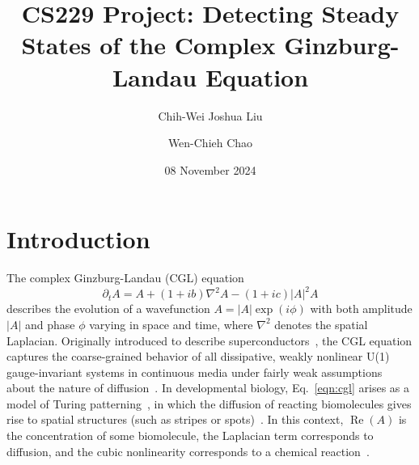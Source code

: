 \documentclass[nofootinbib,pre,superscriptaddress,twocolumn,longbibliography,floatfix]{revtex4-2}
\DeclareMathOperator{\realpart}{Re}
\begin{document}
\title{CS229 Project: Detecting Steady States of the Complex Ginzburg-Landau Equation}

\author{Chih-Wei Joshua Liu}

\author{Wen-Chieh Chao}

\date{08 November 2024}

\maketitle

\section{Introduction}
The complex Ginzburg-Landau (CGL) equation
\begin{equation}
    \partial_t A = A + (1+ib)\nabla^2 A-(1+ic)|A|^2 A
    \label{eqn:cgl}
\end{equation}
describes the evolution of a wavefunction $A=|A|\exp(i\phi)$
with both amplitude $|A|$ and phase $\phi$ varying in space and time,
where $\nabla^2$ denotes the spatial Laplacian.
Originally introduced to describe superconductors~\cite{ginzburg1950k},
the CGL equation captures the coarse-grained behavior of all dissipative,
weakly nonlinear U(1) gauge-invariant systems in continuous media under fairly weak assumptions about the nature of diffusion~\cite{aranson2002world}.
In developmental biology, Eq.~\ref{eqn:cgl} arises as a model of Turing patterning~\cite{kuramoto1984chemical},
in which the diffusion of reacting biomolecules gives rise to spatial structures
(such as stripes or spots)~\cite{turing1952chemical}.
In this context, $\realpart(A)$ is the concentration of some biomolecule,
the Laplacian term corresponds to diffusion, and the cubic nonlinearity corresponds to a chemical reaction~\cite{wigbers2021hierarchy}. 
\end{document}
